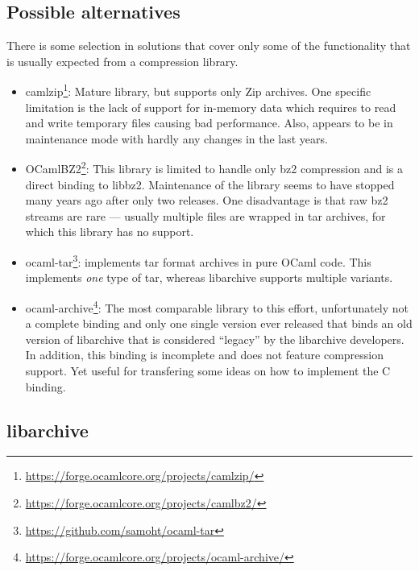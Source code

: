 \documentclass[parskip=half]{scrreprt}
\begin{document}
\subsection{Possible alternatives}
\label{sec:alternatives}

There is some selection in solutions that cover only some of the functionality
that is usually expected from a compression library.

\begin{itemize}
  \item camlzip\footnote{\url{https://forge.ocamlcore.org/projects/camlzip/}}:
    Mature library, but supports only Zip archives. One specific limitation is
    the lack of support for in-memory data which requires to read and write
    temporary files causing bad performance. Also, appears to be in maintenance
    mode with hardly any changes in the last years.
  \item OCamlBZ2\footnote{\url{https://forge.ocamlcore.org/projects/camlbz2/}}:
    This library is limited to handle only bz2 compression and is a direct
    binding to libbz2. Maintenance of the library seems to have stopped many
    years ago after only two releases. One disadvantage is that raw bz2
    streams are rare — usually multiple files are wrapped in tar archives,
    for which this library has no support.
  \item ocaml-tar\footnote{\url{https://github.com/samoht/ocaml-tar}}:
    implements tar format archives in pure OCaml code. This implements
    \emph{one} type of tar, whereas libarchive supports multiple variants.
  \item ocaml-archive\footnote{\url{https://forge.ocamlcore.org/projects/ocaml-archive/}}:
    The most comparable library to this effort, unfortunately not a complete
    binding and only one single version ever released that binds an old version
    of libarchive that is considered \enquote{legacy} by the libarchive
    developers. In addition, this binding is incomplete and does not feature
    compression support. Yet useful for transfering some ideas on how to
    implement the C binding.
\end{itemize}

\subsection{libarchive}
\label{sec:libarchive}
\end{document}
